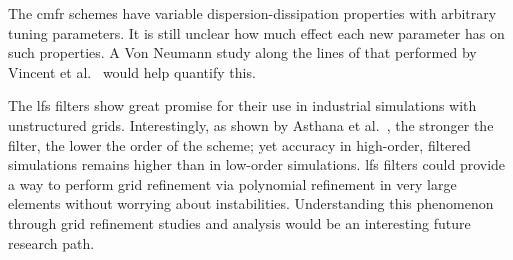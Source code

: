 The \gls{cmfr} schemes have variable dispersion-dissipation properties with arbitrary tuning parameters. It is still unclear how much effect each new parameter has on such properties. A Von Neumann study along the lines of that performed by Vincent et al.~\cite{vincent2011insights} would help quantify this.

The \gls{lfs} filters show great promise for their use in industrial simulations with unstructured grids. Interestingly, as shown by Asthana et al.~\cite{asthana2014}, the stronger the filter, the lower the order of the scheme; yet accuracy in high-order, filtered simulations remains higher than in low-order simulations. \gls{lfs} filters could provide a way to perform grid refinement via polynomial refinement in very large elements without worrying about instabilities. Understanding this phenomenon through grid refinement studies and analysis would be an interesting future research path.

